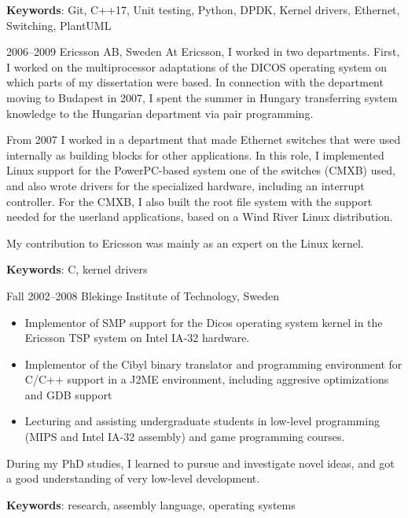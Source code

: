 \documentclass[a4paper]{article}
\begin{document}
\begin{CV}
\textbf{Keywords}: Git, C++17, Unit testing, Python, DPDK, Kernel drivers, Ethernet, Switching, PlantUML

\item[2006--2009] Ericsson AB, Sweden
At Ericsson, I worked in two departments. First, I worked on the multiprocessor adaptations
of the DICOS operating system on which parts of my dissertation were based. In connection
with the department moving to Budapest in 2007, I spent the summer in Hungary transferring
system knowledge to the Hungarian department via pair programming.

From 2007 I worked in a department that made Ethernet switches that were used internally as
building blocks for other applications. In this role, I implemented Linux support for the
PowerPC-based system one of the switches (CMXB) used, and also wrote drivers for the
specialized hardware, including an interrupt controller. For the CMXB, I also built the root
file system with the support needed for the userland applications, based on a Wind River
Linux distribution.

My contribution to Ericsson was mainly as an expert on the Linux kernel.

\textbf{Keywords}: C, kernel drivers

\item[Fall 2002--2008] Blekinge Institute of Technology, Sweden

  \begin{itemize}
  \item Implementor of SMP support for the Dicos operating system
    kernel in the Ericsson TSP system on Intel IA-32 hardware.
  \item Implementor of the Cibyl binary translator and programming environment
    for C/C++ support in a J2ME environment, including aggresive optimizations
    and GDB support
  \item Lecturing and assisting undergraduate students in low-level
    programming (MIPS and Intel IA-32 assembly) and game programming courses.
  \end{itemize}

During my PhD studies, I learned to pursue and investigate novel ideas, and
got a good understanding of very low-level development.

\textbf{Keywords}: research, assembly language, operating systems


\end{CV}
\end{document}
